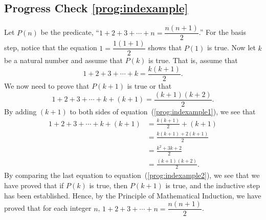 \subsection*{Progress Check \ref{prog:indexample}}
\begin{myproof}
Let $P( n )$ be the predicate, 
``$1 + 2 + 3 +  \cdots  + n = \dfrac{n \left( n + 1 \right)}{2}$.''  For the basis step, notice that the equation $1 = \dfrac{1 \left( 1 + 1 \right)}{2}$ shows that 
$P( 1 )$ is true.  Now \vskip3pt \noindent
 let $k$ be a natural number and assume that 
$P(k )$ is true.  That is, assume that
\setcounter{equation}{0}
\begin{equation}
1 + 2 + 3 +  \cdots  + k = \frac{k \left( k + 1 \right)}{2}. \label{prog:indexample1}
\end{equation}
We now need to prove that $P(k +1 )$ is true or that
\begin{equation}
1 + 2 + 3 +  \cdots  + k + \left( k + 1 \right) = 
\frac{\left( k + 1 \right) \left(k + 2 \right)}{2}. \label{prog:indexample2}
\end{equation}
By adding $\left(k + 1 \right)$ to both sides of equation~(\ref{prog:indexample1}), we see that
\[
\begin{aligned}
1 + 2 + 3 +  \cdots  + k + \left( k + 1 \right) &= 
\frac{k \left( k + 1 \right)}{2} + \left( k + 1 \right) \\
                                 &= \frac{k \left( k + 1 \right) + 2 \left( k + 1 \right)}{2} \\
                                 &= \frac{k^2 + 3k + 2}{2} \\
                                 &= \frac{ \left(k + 1 \right) \left( k + 2 \right)}{2}.
\end{aligned}
\]
By comparing the last equation to equation~(\ref{prog:indexample2}), we see that we have proved that if $P(k )$ is true, then $P( k + 1 )$ is true, and the inductive step has been established.  Hence, by the Principle of Mathematical Induction, we  have proved that for each integer $n$, $1 + 2 + 3 +  \cdots  + n = \dfrac{n \left( n + 1 \right)}{2}$.
\end{myproof}



